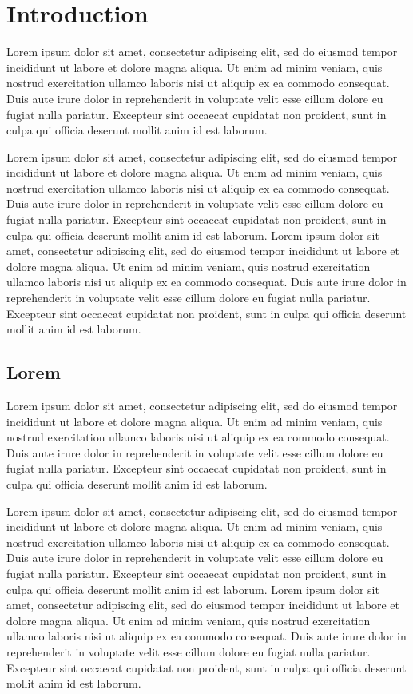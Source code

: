 \chapter{Introduction}
  Lorem ipsum dolor sit amet, consectetur adipiscing elit, sed do eiusmod tempor
  incididunt ut labore et dolore magna aliqua. Ut enim ad minim veniam, quis
  nostrud exercitation ullamco laboris nisi ut aliquip ex ea commodo consequat.
  Duis aute irure dolor in reprehenderit in voluptate velit esse cillum dolore eu
  fugiat nulla pariatur. Excepteur sint occaecat cupidatat non proident, sunt in
  culpa qui officia deserunt mollit anim id est laborum.

  Lorem ipsum dolor sit amet, consectetur adipiscing elit, sed do eiusmod tempor
  incididunt ut labore et dolore magna aliqua. Ut enim ad minim veniam, quis
  nostrud exercitation ullamco laboris nisi ut aliquip ex ea commodo consequat.
  Duis aute irure dolor in reprehenderit in voluptate velit esse cillum dolore eu
  fugiat nulla pariatur. Excepteur sint occaecat cupidatat non proident, sunt in
  culpa qui officia deserunt mollit anim id est laborum.
  Lorem ipsum dolor sit amet, consectetur adipiscing elit, sed do eiusmod tempor
  incididunt ut labore et dolore magna aliqua. Ut enim ad minim veniam, quis
  nostrud exercitation ullamco laboris nisi ut aliquip ex ea commodo consequat.
  Duis aute irure dolor in reprehenderit in voluptate velit esse cillum dolore eu
  fugiat nulla pariatur. Excepteur sint occaecat cupidatat non proident, sunt in
  culpa qui officia deserunt mollit anim id est laborum.

\section{Lorem}
  Lorem ipsum dolor sit amet, consectetur adipiscing elit, sed do eiusmod tempor
  incididunt ut labore et dolore magna aliqua. Ut enim ad minim veniam, quis
  nostrud exercitation ullamco laboris nisi ut aliquip ex ea commodo consequat.
  Duis aute irure dolor in reprehenderit in voluptate velit esse cillum dolore eu
  fugiat nulla pariatur. Excepteur sint occaecat cupidatat non proident, sunt in
  culpa qui officia deserunt mollit anim id est laborum.

  Lorem ipsum dolor sit amet, consectetur adipiscing elit, sed do eiusmod tempor
  incididunt ut labore et dolore magna aliqua. Ut enim ad minim veniam, quis
  nostrud exercitation ullamco laboris nisi ut aliquip ex ea commodo consequat.
  Duis aute irure dolor in reprehenderit in voluptate velit esse cillum dolore eu
  fugiat nulla pariatur. Excepteur sint occaecat cupidatat non proident, sunt in
  culpa qui officia deserunt mollit anim id est laborum.
  Lorem ipsum dolor sit amet, consectetur adipiscing elit, sed do eiusmod tempor
  incididunt ut labore et dolore magna aliqua. Ut enim ad minim veniam, quis
  nostrud exercitation ullamco laboris nisi ut aliquip ex ea commodo consequat.
  Duis aute irure dolor in reprehenderit in voluptate velit esse cillum dolore eu
  fugiat nulla pariatur. Excepteur sint occaecat cupidatat non proident, sunt in
  culpa qui officia deserunt mollit anim id est laborum.

